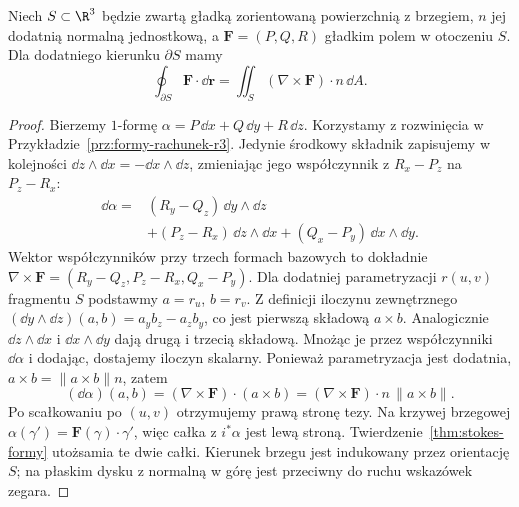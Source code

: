 \begin{wniosek}
\label{cor:stokes-curl}
Niech $S\subset\R^3$ będzie zwartą gładką
zorientowaną powierzchnią z brzegiem,
$n$ jej dodatnią normalną jednostkową,
a $\mathbf F=(P,Q,R)$ gładkim polem w otoczeniu $S$.
Dla dodatniego kierunku $\partial S$ mamy
\[
 \oint_{\partial S}\mathbf F\cdot\dd\mathbf r
 =\iint_S(\nabla\times\mathbf F)\cdot n\,\dd A.
\]
\end{wniosek}
\begin{proof}
Bierzemy $1$-formę
$\alpha=P\,\dd x+Q\,\dd y+R\,\dd z$.
Korzystamy z rozwinięcia w
Przykładzie~\ref{prz:formy-rachunek-r3}.
Jedynie środkowy składnik zapisujemy w kolejności
$\dd z\wedge\dd x=-\dd x\wedge\dd z$,
zmieniając jego współczynnik z $R_x-P_z$ na $P_z-R_x$:
\[
 \begin{aligned}
 \dd\alpha={}&(R_y-Q_z)\,\dd y\wedge\dd z\\
 &+(P_z-R_x)\,\dd z\wedge\dd x
 +(Q_x-P_y)\,\dd x\wedge\dd y.
 \end{aligned}
\]
Wektor współczynników przy trzech formach
bazowych to dokładnie
$\nabla\times\mathbf F
=(R_y-Q_z,P_z-R_x,Q_x-P_y)$.
Dla dodatniej parametryzacji
$r(u,v)$ fragmentu $S$ podstawmy
$a=r_u$, $b=r_v$. Z definicji iloczynu
zewnętrznego
$(\dd y\wedge\dd z)(a,b)=a_yb_z-a_zb_y$,
co jest pierwszą składową $a\times b$.
Analogicznie $\dd z\wedge\dd x$ i $\dd x\wedge\dd y$
dają drugą i trzecią składową. Mnożąc je przez współczynniki
$\dd\alpha$ i dodając, dostajemy iloczyn skalarny.
Ponieważ parametryzacja jest dodatnia,
$a\times b=\|a\times b\|n$, zatem
\[
 (\dd\alpha)(a,b)
 =(\nabla\times\mathbf F)\cdot(a\times b)
 =(\nabla\times\mathbf F)\cdot n\,
    \lVert a\times b\rVert.
\]
Po scałkowaniu po $(u,v)$ otrzymujemy prawą
stronę tezy. Na krzywej brzegowej
$\alpha(\gamma')=\mathbf F(\gamma)\cdot\gamma'$,
więc całka z $i^*\alpha$ jest lewą stroną.
Twierdzenie~\ref{thm:stokes-formy} utożsamia
te dwie całki. Kierunek brzegu jest
indukowany przez orientację $S$; na płaskim
dysku z normalną w górę jest przeciwny
do ruchu wskazówek zegara.
\end{proof}

